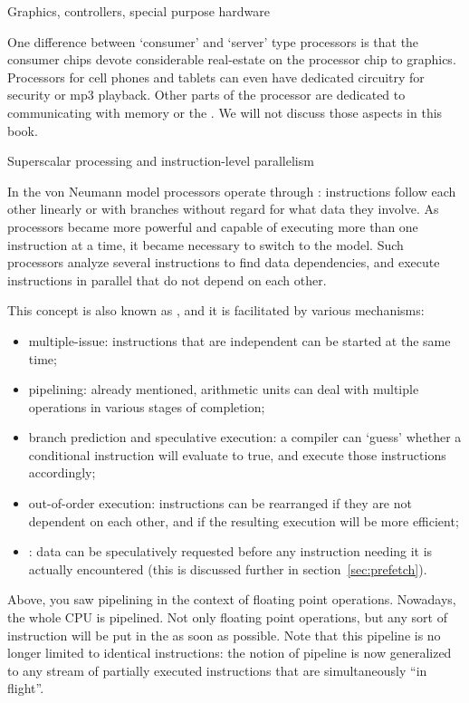  {Graphics, controllers, special purpose hardware}

One difference between `consumer' and `server' type processors
is that the consumer chips devote considerable real-estate
on the processor chip to graphics. Processors for cell phones and tablets
can even have dedicated circuitry for security or mp3 playback.
Other parts of the processor
are dedicated to communicating with memory or the .
We will not discuss those aspects in this book.

 {Superscalar processing and instruction-level parallelism}
\label{sec:pipelinecpu}

In the von Neumann model processors operate through :
instructions follow each other linearly or with branches without regard for what
data they involve. As processors became more powerful and capable of executing
more than one instruction at a time, it became necessary to switch to the
 model. Such  processors
analyze several instructions to find data dependencies, and execute
instructions in parallel that do not depend on each other.

This concept is also known as , and it is facilitated by
various mechanisms:
\begin{itemize}
\item multiple-issue: instructions that are independent can be started
  at the same time;
\item pipelining: already mentioned, arithmetic units can deal with
  multiple operations in various stages of completion;
\item branch prediction and speculative execution: a compiler can
  `guess' whether a conditional instruction will evaluate to true, and
  execute those instructions accordingly;
\item out-of-order execution: instructions can be rearranged if they
  are not dependent on each other, and if the resulting execution will
  be more efficient;
\item {}: data can be speculatively requested before any
  instruction needing it is actually encountered (this is discussed
  further in section~\ref{sec:prefetch}).
\end{itemize}

Above, you saw pipelining in the context of floating point
operations. Nowadays, the whole \ac{CPU} is pipelined. Not only floating point
operations, but any sort of instruction will be put in the
 as soon
as possible. Note that this pipeline is no longer limited to identical
instructions: the notion of pipeline is now generalized to any stream
of partially executed instructions that are simultaneously ``in
flight''.

